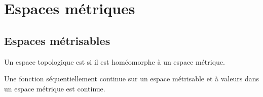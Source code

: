 
\section{Espaces métriques}

\subsection{Espaces métrisables}

\begin{definition}
	Un espace topologique est  si il est homéomorphe à un espace métrique.
\end{definition}


\begin{proposition} \label{PROPooKNVUooMbLZoy}
	Une fonction séquentiellement continue sur un espace métrisable et à valeurs dans un espace métrique est continue.
\end{proposition}

